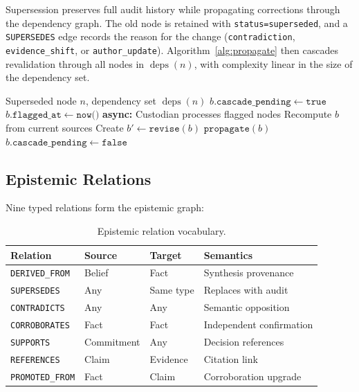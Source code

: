 \documentclass[11pt,letterpaper]{article}
\begin{document}
Supersession preserves full audit history while propagating corrections through the dependency graph. The old node is retained with \texttt{status=superseded}, and a \texttt{SUPERSEDES} edge records the reason for the change (\texttt{contradiction}, \texttt{evidence\_shift}, or \texttt{author\_update}). Algorithm~\ref{alg:propagate} then cascades revalidation through all nodes in $\operatorname{deps}(n)$, with complexity linear in the size of the dependency set.

\begin{algorithm}[H]
\caption{Cascade propagation via async flagging}
\label{alg:propagate}
\begin{algorithmic}[1]
\Require Superseded node $n$, dependency set $\operatorname{deps}(n)$
    \State $b.\texttt{cascade\_pending} \gets \texttt{true}$
    \State $b.\texttt{flagged\_at} \gets \texttt{now()}$
\EndFor
\State \textbf{async:} Custodian processes flagged nodes
    \State Recompute $b$ from current sources
        \State Create $b' \gets \texttt{revise}(b)$
        \State $\texttt{propagate}(b)$ 
    \EndIf
    \State $b.\texttt{cascade\_pending} \gets \texttt{false}$
\EndFor
\end{algorithmic}
\end{algorithm}

\subsection{Epistemic Relations}

Nine typed relations form the epistemic graph:

\begin{table}[H]
\centering
\caption{Epistemic relation vocabulary.}
\label{tab:relations}
\begin{tabular}{@{}llll@{}}
\toprule
\textbf{Relation} & \textbf{Source} & \textbf{Target} & \textbf{Semantics} \\
\midrule
\texttt{DERIVED\_FROM} & Belief & Fact & Synthesis provenance \\
\texttt{SUPERSEDES} & Any & Same type & Replaces with audit \\
\texttt{CONTRADICTS} & Any & Any & Semantic opposition \\
\texttt{CORROBORATES} & Fact & Fact & Independent confirmation \\
\texttt{SUPPORTS} & Commitment & Any & Decision references \\
\texttt{REFERENCES} & Claim & Evidence & Citation link \\
\texttt{PROMOTED\_FROM} & Fact & Claim & Corroboration upgrade \\
\bottomrule
\end{tabular}
\end{table}
\end{document}
